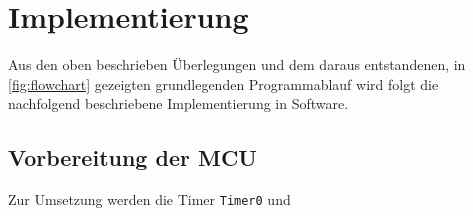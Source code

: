\chapter{Implementierung}
	Aus den oben beschrieben Überlegungen und dem daraus entstandenen, in \cref{fig:flowchart} gezeigten grundlegenden Programmablauf wird folgt die nachfolgend beschriebene Implementierung in Software.

	\section{Vorbereitung der MCU}
		Zur Umsetzung werden die Timer \texttt{Timer0} und \texttt{}